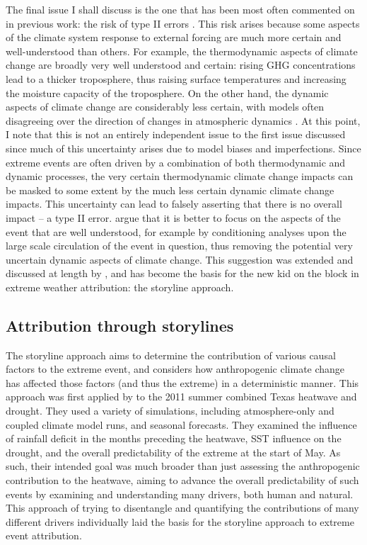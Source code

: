     The final issue I shall discuss is the one that has been most often commented on in previous work: the risk of type II errors \citep{shepherd_common_2016,trenberth_attribution_2015}. This risk arises because some aspects of the climate system response to external forcing are much more certain and well-understood than others. For example, the thermodynamic aspects of climate change are broadly very well understood and certain: rising GHG concentrations lead to a thicker troposphere, thus raising surface temperatures and increasing the moisture capacity of the troposphere. On the other hand, the dynamic aspects of climate change are considerably less certain, with models often disagreeing over the direction of changes in atmospheric dynamics \citep{masato_winter_2013}. At this point, I note that this is not an entirely independent issue to the first issue discussed since much of this uncertainty arises due to model biases and imperfections. Since extreme events are often driven by a combination of both thermodynamic and dynamic processes, the very certain thermodynamic climate change impacts can be masked to some extent by the much less certain dynamic climate change impacts. This uncertainty can lead to falsely asserting that there is no overall impact -- a type II error. \citet{trenberth_attribution_2015} argue that it is better to focus on the aspects of the event that are well understood, for example by conditioning analyses upon the large scale circulation of the event in question, thus removing the potential very uncertain dynamic aspects of climate change. This suggestion was extended and discussed at length by \citet{shepherd_common_2016}, and has become the basis for the new kid on the block in extreme weather attribution: the storyline approach.

  \subsection{Attribution through storylines}\label{intro:storylines}

    The storyline approach \citep[or `Boulder' approach,][]{otto_attribution_2017} aims to determine the contribution of various causal factors to the extreme event, and considers how anthropogenic climate change has affected those factors (and thus the extreme) in a deterministic manner. This approach was first applied by \citet{hoerling_anatomy_2013} to the 2011 summer combined Texas heatwave and drought. They used a variety of simulations, including atmosphere-only and coupled climate model runs, and seasonal forecasts. They examined the influence of rainfall deficit in the months preceding the heatwave, SST influence on the drought, and the overall predictability of the extreme at the start of May. As such, their intended goal was much broader than just assessing the anthropogenic contribution to the heatwave, aiming to advance the overall predictability of such events by examining and understanding many drivers, both human and natural. This approach of trying to disentangle and quantifying the contributions of many different drivers individually laid the basis for the storyline approach to extreme event attribution.


